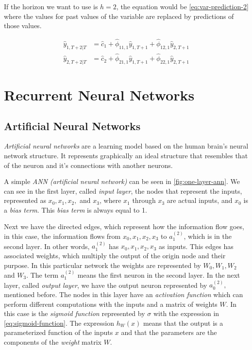 If the horizon we want to use is $h = 2$, the equation would be
\autoref{eq:var-prediction-2} where the values for past values of the
variable are replaced by predictions of those values.

\begin{equation}
  \begin{aligned}
    \label{eq:var-prediction-2}
    \hat{y}_{1,T+2|T} & = \hat{c}_1 + \hat{\phi}_{11,1} \hat{y}_{1,T+1} +
    \hat{\phi}_{12,1} \hat{y}_{2,T+1} \\ 
    \hat{y}_{2,T+2|T} & = \hat{c}_2 + \hat{\phi}_{21,1} \hat{y}_{1,T+1} +
    \hat{\phi}_{22,1} \hat{y}_{2,T+1}
  \end{aligned}
\end{equation}
\chapter{Recurrent Neural Networks}
\label{ch:recurrent-neural-networks}

\section{Artificial Neural Networks}

\textit{Artificial neural networks} are a learning model based on the
human brain's neural network structure. It represents graphically an
ideal structure that resembles that of the neuron and it's connections
with another neurons.

A simple \textit{ANN (artificial neural network)} can be seen in
\autoref{fig:one-layer-ann}. We can see in the first layer, called
\textit{input layer}, the nodes that represent the inputs, represented
as $x_0, x_1, x_2,$ and $x_3$, where $x_1$ through $x_3$ are actual
inputs, and $x_0$ is a \textit{bias term}. This \textit{bias term} is
always equal to 1.

Next we have the directed edges, which represent how the information
flow goes, in this case, the information flows from $x_0, x_1, x_2,
x_3$ to $a_1^{(2)}$, which is in the second layer. In other words,
$a_1^{(2)}$ has $x_0, x_1, x_2, x_3$ as inputs. This edges has
associated weights, which multiply the output of the origin node and
their purpose. In this particular network the weights are represented
by $W_0, W_1, W_2$ and $W_3$. The term $a_1^{(2)}$ means the first
neuron in the second layer. In the next layer, called \textit{output
layer}, we have the output neuron represented by $a_0^{(2)},$
mentioned before. The nodes in this layer have an \textit{activation
function} which can perform different computations with the inputs and
a matrix of weights $W$. In this case is the \textit{sigmoid function}
represented by $\sigma$ with the expression in
\autoref{eq:sigmoid-function}. The expression $h_W(x)$ means that the
output is a parameterized function of the inputs $x$ and that the
parameters are the components of the \textit{weight} matrix $W$.

